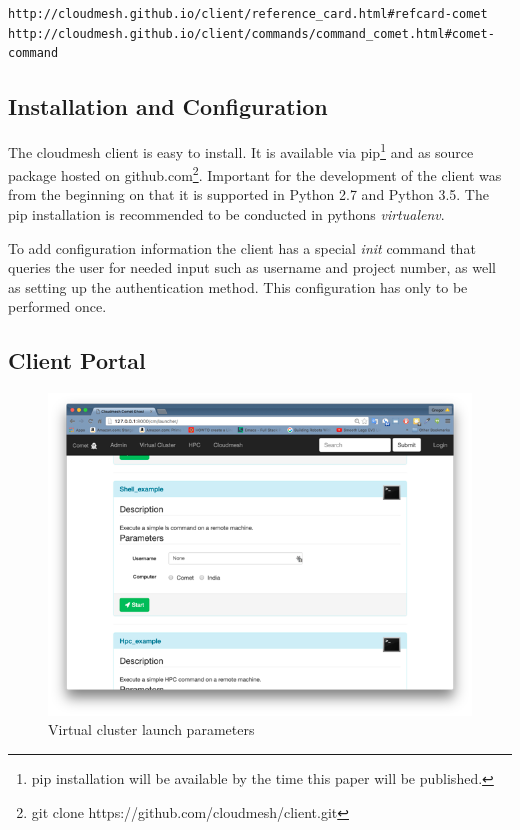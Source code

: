 \begin{verbatim}
http://cloudmesh.github.io/client/reference_card.html#refcard-comet
http://cloudmesh.github.io/client/commands/command_comet.html#comet-command
\end{verbatim}

\subsection{Installation and Configuration}

The cloudmesh client is easy to install. It is available via
pip\footnote{pip installation will be available by the time this paper
  will be published.} and as source package hosted on
github.com\footnote{git clone
  https://github.com/cloudmesh/client.git}. Important for the
development of the client was from the beginning on that it is
supported in Python 2.7 and Python 3.5. The pip installation is
recommended to be conducted in pythons {\em virtualenv}.

To add configuration information the client has a special {\em init}
command that queries the user for needed input such as username and
project number, as well as setting up the authentication method. This
configuration has only to be performed once.

\subsection{Client Portal}

\begin{figure}[htb] 
  \centering 
    \includegraphics[width=1.0\columnwidth]{images/client/Picture6.png} 
    \caption{Virtual cluster launch parameters}
    \label{F:6}
\end{figure} 

